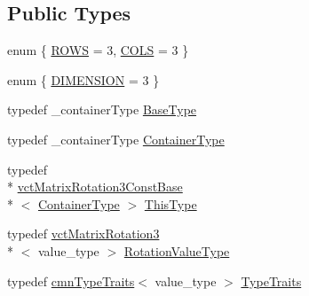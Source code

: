 \subsection*{Public Types}
\begin{DoxyCompactItemize}
\item 
enum \{ \hyperlink{classvct_matrix_rotation3_const_base_a559a478b4507d44a75aab17fcc1c6277a24a90e4fecc47d3868084e10241213b5}{R\-O\-W\-S} = 3, 
\hyperlink{classvct_matrix_rotation3_const_base_a559a478b4507d44a75aab17fcc1c6277a4e0ad6e4f34b6d668a5db06227afa293}{C\-O\-L\-S} = 3
 \}
\item 
enum \{ \hyperlink{classvct_matrix_rotation3_const_base_a6bc9712dde55ee3fca0d7880feb6a903afdf02f4ad230d81f0ca2539c7feb61f3}{D\-I\-M\-E\-N\-S\-I\-O\-N} = 3
 \}
\item 
typedef \-\_\-container\-Type \hyperlink{classvct_matrix_rotation3_const_base_a1f40b2353fc88d70bf853d4557eaae99}{Base\-Type}
\item 
typedef \-\_\-container\-Type \hyperlink{classvct_matrix_rotation3_const_base_a59e670b3a79131c32fa5ce28a9275509}{Container\-Type}
\item 
typedef \\*
\hyperlink{classvct_matrix_rotation3_const_base}{vct\-Matrix\-Rotation3\-Const\-Base}\\*
$<$ \hyperlink{classvct_matrix_rotation3_const_base_a59e670b3a79131c32fa5ce28a9275509}{Container\-Type} $>$ \hyperlink{classvct_matrix_rotation3_const_base_ad26bf016ce37ea0532e1ce0aa7bba8a0}{This\-Type}
\item 
typedef \hyperlink{classvct_matrix_rotation3}{vct\-Matrix\-Rotation3}\\*
$<$ value\-\_\-type $>$ \hyperlink{classvct_matrix_rotation3_const_base_a913ecee79856db867ac6d45d27cfe362}{Rotation\-Value\-Type}
\item 
typedef \hyperlink{classcmn_type_traits}{cmn\-Type\-Traits}$<$ value\-\_\-type $>$ \hyperlink{classvct_matrix_rotation3_const_base_af73335dedec5af83c5715335bbc8fce1}{Type\-Traits}
\end{DoxyCompactItemize}
